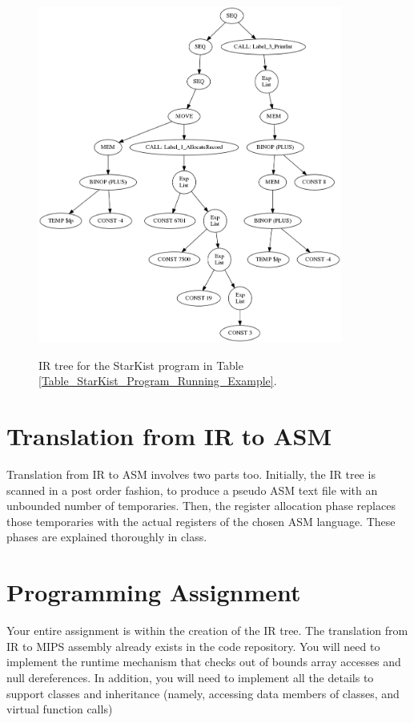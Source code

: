 \documentclass{article}
\begin{document}
\begin{figure}[htbp]
\begin{center}
  \includegraphics[width = 10cm]{IRTreeRunningExample.png}\\
  \caption{IR tree for the StarKist program in Table \ref{Table_StarKist_Program_Running_Example}.
  \label{IR_Tree_Running_Example}}
\end{center}
\end{figure}

\section{Translation from IR to ASM}
Translation from IR to ASM involves two parts too.
Initially, the IR tree is scanned in a post order fashion,
to produce a pseudo ASM text file with an unbounded number of temporaries.
Then, the register allocation phase replaces those temporaries with
the actual registers of the chosen ASM language. 
These phases are explained thoroughly in class.

\section{Programming Assignment}
Your entire assignment is within the creation of the IR tree.
The translation from IR to MIPS assembly already exists in the code repository.
You will need to implement the runtime mechanism that
checks out of bounds array accesses and null dereferences.
In addition, you will need to implement all the details
to support classes and inheritance
(namely, accessing data members of classes, and virtual function calls) 
\end{document}
